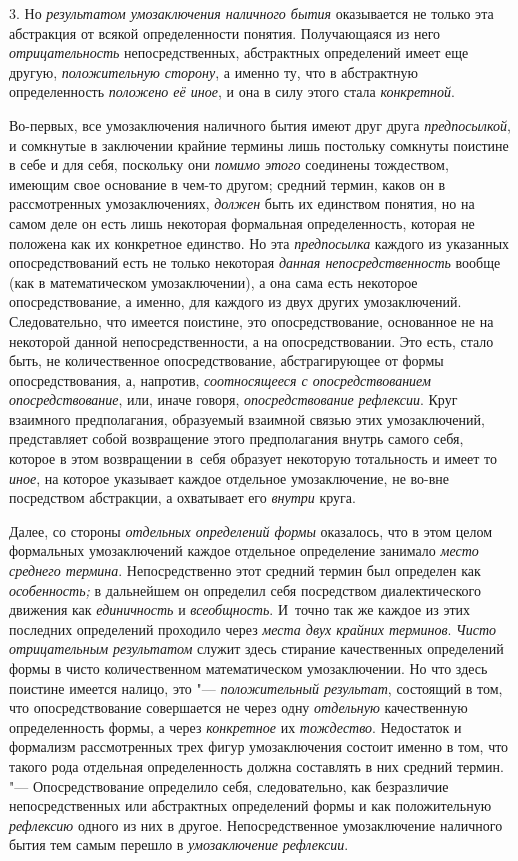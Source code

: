 3. Но {\em результатом
умозаключения наличного бытия} оказывается не только эта
абстракция от всякой определенности понятия. Получающаяся из него
{\em отрицательность}
непосредственных, абстрактных определений имеет еще другую,
{\em положительную сторону},
а именно ту, что в абстрактную определенность
{\em положено её иное},
и она в силу этого стала
{\em конкретной}.

Во-первых, все умозаключения наличного бытия имеют друг друга
{\em предпосылкой}, и
сомкнутые в заключении крайние термины лишь постольку сомкнуты поистине в
себе и для себя, поскольку они {\em помимо этого}
соединены тождеством, имеющим свое основание в чем-то другом;
средний термин, каков он в рассмотренных умозаключениях, {\em должен} быть
их единством понятия, но на самом деле он есть лишь некоторая формальная
определенность, которая не положена как их конкретное единство. Но эта
{\em предпосылка} каждого из указанных опосредствований есть не только
некоторая {\em данная непосредственность}
вообще (как в математическом умозаключении), а она сама есть
некоторое опосредствование, а именно, для каждого из двух других
умозаключений. Следовательно, что имеется поистине, это опосредствование,
основанное не на некоторой данной непосредственности, а на
опосредствовании. Это есть, стало быть, не количественное опосредствование,
абстрагирующее от формы опосредствования, а, напротив,
{\em соотносящееся с опосредствованием
опосредствование}, или, иначе говоря, {\em опосредствование рефлексии}.
Круг взаимного предполагания, образуемый взаимной связью этих
умозаключений, представляет собой возвращение этого предполагания внутрь
самого себя, которое в этом возвращении в~себя образует некоторую
тотальность и имеет то {\em иное},
на которое указывает каждое отдельное умозаключение, не
во-вне посредством абстракции, а охватывает его {\em внутри} круга.

Далее, со стороны {\em отдельных определений формы}
оказалось, что в этом целом формальных умозаключений каждое
отдельное определение занимало {\em место среднего термина}.
Непосредственно этот средний термин был определен как {\em особенность;} в
дальнейшем он определил себя посредством диалектического движения как
{\em единичность} и {\em всеобщность}.
И~точно так же каждое из этих последних определений проходило через
{\em места двух крайних терминов}. {\em Чисто отрицательным результатом}
служит здесь стирание качественных определений формы в чисто
количественном математическом умозаключении. Но что здесь поистине имеется
налицо, это "--- {\em положительный
результат}, состоящий в том, что опосредствование
совершается не через одну {\em отдельную}
качественную определенность формы, а через
{\em конкретное} их {\em тождество}.
Недостаток и формализм рассмотренных трех фигур умозаключения
состоит именно в том, что такого рода отдельная определенность должна
составлять в них средний термин. "--- Опосредствование
определило себя, следовательно, как безразличие непосредственных или
абстрактных определений формы и как положительную
{\em рефлексию} одного из них в другое. Непосредственное
умозаключение наличного бытия тем самым перешло в
{\em умозаключение рефлексии}.\label{bkm:bm110b}

